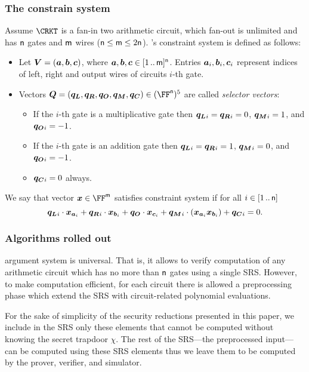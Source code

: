 \documentclass[runningheads,11pt]{llncs}
\let\spvec\vec
\let\vec\accentvec
\let\spvec\vec
\let\vec\spvec
\def\vec#1{\mathchoice{\mbox{\boldmath$\displaystyle#1$}}
  {\mbox{\boldmath$\textstyle#1$}} {\mbox{\boldmath$\scriptstyle#1$}}
  {\mbox{\boldmath$\scriptscriptstyle#1$}}}
\begin{document}
\subsubsection{The constrain system}
Assume $\CRKT$ is a fan-in two arithmetic circuit,
which fan-out is unlimited and has $\mathsf{n}$ gates and $\mathsf{m}$ wires
($\mathsf{n} \leq \mathsf{m} \leq 2\mathsf{n}$). \plonk's constraint
system is defined as follows:
\begin{itemize}
\item Let $\vec{V} = (\va, \vb, \vc)$, where $\va, \vb, \vc
  \in \range{1}{\noofw}^\numberofconstrains$. Entries $\va_i, \vb_i, \vc_i$ represent indices of left,
  right and output wires of circuits $i$-th gate.
\item Vectors $\vec{Q} = (\vql, \vqr, \vqo, \vqm, \vqc) \in
  (\FF^\numberofconstrains)^5$ are called \emph{selector vectors}:
  \begin{itemize}
  \item If the $i$-th gate is a multiplicative gate then $\vql_i = \vqr_i = 0$,
    $\vqm_i = 1$, and $\vqo_i = -1$. 
  \item If the $i$-th gate is an addition gate then $\vql_i = \vqr_i  = 1$, $\vqm_i =
    0$, and $\vqo_i = -1$. 
  \item $\vqc_i = 0$ always. 
  \end{itemize}
\end{itemize}

We say that vector $\vx \in \FF^\noofw$ satisfies constraint system if for all $i
\in [1 \, .. \, \mathsf{n}]$
\[
  \vql_i \cdot \vx_{\va_i} + \vqr_i \cdot \vx_{\vb_i} + \vqo \cdot \vx_{\vc_i} +
  \vqm_i \cdot (\vx_{\va_i} \vx_{\vb_i}) + \vqc_i = 0. 
\]

\subsubsection{Algorithms rolled out}
\label{sec:plonk_explained}
\plonk{} argument system is universal. That is, it allows to verify computation
of any arithmetic circuit which has no more than $\mathsf{n}$
gates using a single SRS. However, to make computation efficient, for each
circuit there is allowed a preprocessing phase which extend the SRS with
circuit-related polynomial evaluations.

For the sake of simplicity of the security reductions presented in this paper, we
include in the SRS only these elements that cannot be computed without knowing
the secret trapdoor $\chi$. The rest of the SRS---the preprocessed input---can
be computed using these SRS elements thus we leave them to be computed by the
prover, verifier, and simulator.
\end{document}
